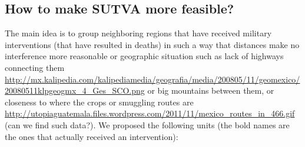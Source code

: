 \documentclass{article}[11 pt]
\begin{document}
\subsection{How to make SUTVA more feasible?}
The main idea is to group neighboring regions that have received military interventions (that have resulted in deaths) in such a way that distances make no interference more reasonable or geographic situation such as lack of highways connecting them \url{http://mx.kalipedia.com/kalipediamedia/geografia/media/200805/11/geomexico/20080511klpgeogmx_4_Ges_SCO.png} or big mountains between them, or closeness to where the crops or smuggling routes are \url{http://utopiaguatemala.files.wordpress.com/2011/11/mexico_routes_in_466.gif} (can we find such data?).
We proposed the following units (the bold names are the ones that actually received an intervention):
\end{document}
